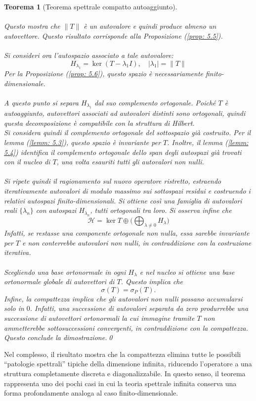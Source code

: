 \documentclass[a4paper,12pt]{report}
\newtheorem{teorema}{Teorema}[chapter]
\begin{document}
\begin{teorema}[Teorema spettrale compatto autoaggiunto]
\\
\\Questo mostra che $\|T\|$ è un autovalore e quindi produce almeno un autovettore. Questo risultato corrisponde alla Proposizione (\ref{prop: 5.5}).
\\
\\Si consideri ora l’autospazio associato a tale autovalore:
\[
H_{\lambda_1}=\ker(T-\lambda_1 I), \quad |\lambda_1|=\|T\|
\]
Per la Proposizione (\ref{prop: 5.6}), questo spazio è necessariamente finito-dimensionale.
\\
\\A questo punto si separa $H_{\lambda_1}$ dal suo complemento ortogonale. Poiché $T$ è autoaggiunto, autovettori associati ad autovalori distinti sono ortogonali, quindi questa decomposizione è compatibile con la struttura di Hilbert.
\\Si considera quindi il complemento ortogonale del sottospazio già costruito. Per il lemma (\ref{lemm: 5.3}), questo spazio è invariante per $T$. Inoltre, il lemma (\ref{lemm: 5.4}) identifica il complemento ortogonale dello span degli autospazi già trovati con il nucleo di $T$, una volta esauriti tutti gli autovalori non nulli.
\\
\\Si ripete quindi il ragionamento sul nuovo operatore ristretto, estraendo iterativamente autovalori di modulo massimo sui sottospazi residui e costruendo i relativi autospazi finito-dimensionali. Si ottiene così una famiglia di autovalori reali $\{\lambda_n\}$ con autospazi $H_{\lambda_n}$, tutti ortogonali tra loro. Si osserva infine che
\[
\mathscr H=\ker T \oplus \bigg(\bigoplus_{\lambda\neq 0} H_\lambda\bigg)
\]
Infatti, se restasse una componente ortogonale non nulla, essa sarebbe invariante per $T$ e non conterrebbe autovalori non nulli, in contraddizione con la costruzione iterativa.
\\
\\Scegliendo una base ortonormale in ogni $H_\lambda$ e nel nucleo si ottiene una base ortonormale globale di autovettori di $T$. Questo implica che
\[
\sigma(T)=\sigma_P(T).
\]
Infine, la compattezza implica che gli autovalori non nulli possano accumularsi solo in $0$. Infatti, una successione di autovalori separata da zero produrrebbe una successione di autovettori ortonormali la cui immagine tramite $T$ non ammetterebbe sottosuccessioni convergenti, in contraddizione con la compattezza. Questo conclude la dimostrazione.\qed
\end{teorema}
\vspace{1cm}
Nel complesso, il risultato mostra che la compattezza elimina tutte le possibili “patologie spettrali” tipiche della dimensione infinita, riducendo l’operatore a una struttura completamente discreta e diagonalizzabile. In questo senso, il teorema rappresenta uno dei pochi casi in cui la teoria spettrale infinita conserva una forma profondamente analoga al caso finito-dimensionale.
\end{document}
